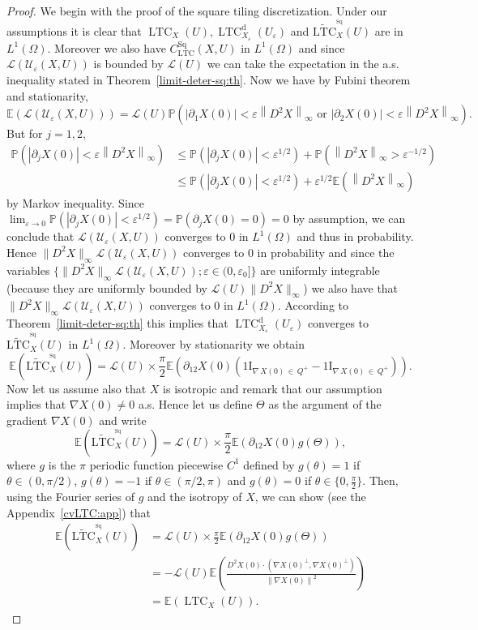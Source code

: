 \documentclass[10pt]{amsart}
\theoremstyle{definition}\newtheorem{defi}[theo]{Definition}\newtheorem{rema}[theo]{Remark}\newtheorem{exam}[theo]{Example}\newtheorem{exem}[theo]{Example}\newtheorem{nota}[theo]{Notation}
\newcommand{\bbP}{\mathbb{P}}
\newcommand{\E}{\mathbb{E}}
\newcommand{\ind}{{1\!\!\mathrm{I}}}
\newcommand{\eps}{\varepsilon}
\DeclareMathOperator{\LTC}{LTC}
\newcommand{\dd}{\mathrm{d}}
\DeclareMathOperator{\Sq}{Sq}
\newcommand{\tLTC}{\widetilde{\mathrm{LTC}}}
\newcommand{\calL}{\mathcal{L}}
\newcommand{\calU}{\mathcal{U}}
\begin{document}
\begin{proof}
We begin with the proof of the square tiling
discretization. Under our assumptions it is clear that $\LTC_X(U),
\LTC^{\dd}_{X_\eps}(U_\eps)$ and $\tLTC^{^{\Sq}}_{X}(U)$ are in $L^1(\Omega)$. Moreover we also have $C_{\LTC}^{\Sq}(X,U)$ in $L^1(\Omega)$ and since ${\calL}(\calU_{\eps}(X,U))$ is bounded by ${\calL}(U)$ we can take the expectation in the a.s. inequality stated in Theorem~\ref{limit-deter-sq:th}. Now we have by Fubini theorem and stationarity,
\[
\E\left({\calL}(\calU_{\eps}(X,U))\right)={\calL}(U)\bbP\left(\left|\partial_1 X(0)\right|<\eps \left\|D^2 X\right\|_\infty \text{ or } \left|\partial_2 X(0)\right|<\eps \left\|D^2 X\right\|_\infty \right).
\]
But for $j=1,2$,
\begin{align*}
\bbP\left(\left|\partial_j X(0)\right|<\eps \left\|D^2 X\right\|_\infty\right)&\le \bbP\left(\left|\partial_j X(0)\right|<\eps^{1/2}\right)+ \bbP\left(\left\|D^2 X\right\|_\infty>\eps^{-1/2}\right)\\
&\le \bbP\left(\left|\partial_j X(0)\right|<\eps^{1/2}\right)+\eps^{1/2}\E\left(\left\|D^2 X\right\|_\infty\right)
\end{align*}
by Markov inequality. Since $\lim_{\eps\rightarrow 0}\bbP(|\partial_j X(0)|<\eps^{1/2})=\bbP(\partial_j X(0)=0)=0$ by assumption, we can conclude that ${\calL}(\calU_{\eps}(X,U))$ converges to $0$ in $L^1(\Omega)$ and thus in probability. Hence $\|D^2 X\|_\infty {\calL}(\calU_{\eps}(X,U))$ converges to $0$ in probability and since the variables $\{\|D^2 X\|_\infty {\calL}(\calU_{\eps}(X,U)); \eps\in (0,\eps_0]\}$ are uniformly integrable (because they are uniformly bounded by ${\calL}(U)\|D^2 X\|_\infty$) we also have that $\|D^2 X\|_\infty {\calL}(\calU_{\eps}(X,U))$ converges to $0$ in $L^1(\Omega)$. According to Theorem~\ref{limit-deter-sq:th} this implies that $\LTC^\dd_{X_\eps}(U_\eps)$ converges to $\tLTC^{^{\Sq}}_{X}(U)$ in $L^1(\Omega)$. Moreover by stationarity we obtain
\[
\E\left(\tLTC^{^{\Sq}}_{X}(U)\right)={\calL}(U)\times \frac{\pi}{2}\E\left(\partial_{12}X(0)\left(\ind_{\nabla\,X(0)\,\in\,Q^+}-\ind_{\nabla\, X(0)\,\in\,Q^+}\right)\right).
\]
Now let us assume also that $X$ is isotropic and remark that our assumption implies that $\nabla X(0)\neq 0$ a.s. Hence let us define $\Theta$ as the argument of the gradient $\nabla X(0)$ and write
\[
\E\left(\tLTC^{^{\Sq}}_{X}(U)\right)={\calL}(U)\times \frac{\pi}{2}\E\left(\partial_{12}X(0)g(\Theta)\right),
\]
where $g$ is the $\pi$ periodic function piecewise $C^1$ defined by $g(\theta)=1$ if $\theta\in (0,\pi/2)$, $g(\theta)=-1$ if $\theta\in (\pi/2,\pi)$ and $g(\theta)=0$ if $\theta\in\{0,\frac{\pi}{2}\}$. Then, using the Fourier series of $g$ and the isotropy of $X$, we can show (see the Appendix~\ref{cvLTC:app}) that
\begin{align*}
\E\left(\tLTC^{^{\Sq}}_{X}(U)\right)&=\calL(U)\times
\frac{\pi}{2}\E\left(\partial_{12}X(0)g(\Theta)\right) \\
&=- {\calL}(U) \E\left(\frac{D^2X(0)\cdot \left(\nabla X(0)^\perp,\nabla X(0)^\perp\right)}{\left\|\nabla X(0)\right\|^2}\right)\\
&=\E\left(\LTC_X(U)\right).
\end{align*}


\end{proof}
\end{document}
